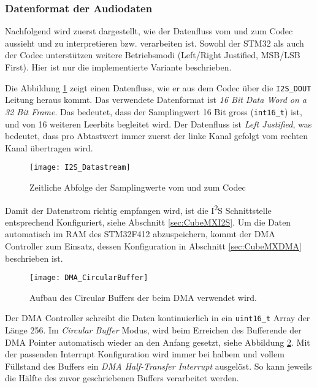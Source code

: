 \subsubsection{Datenformat der Audiodaten}
\label{sec:Dataformat}

Nachfolgend wird zuerst dargestellt, wie der Datenfluss vom und zum Codec aussieht und zu interpretieren bzw. verarbeiten ist. 
Sowohl der STM32 als auch der Codec unterstützen weitere Betriebsmodi (Left/Right Justified, MSB/LSB First). Hier ist nur die implementierte Variante beschrieben.

Die Abbildung \ref{pic:I2S_Datastream} zeigt einen Datenfluss, wie er aus dem Codec über die \texttt{I2S\_DOUT} Leitung heraus kommt. 
Das verwendete Datenformat ist \textit{16 Bit Data Word on a 32 Bit Frame}. Das bedeutet, dass der Samplingwert 16 Bit gross (\texttt{int16\_t}) ist, und von 16 weiteren Leerbits begleitet wird.
Der Datenfluss ist \textit{Left Justified}, was bedeutet, dass pro Abtastwert immer zuerst der linke Kanal gefolgt vom rechten Kanal übertragen wird.

\begin{figure}[H]
	\centering
	\texttt{[image: I2S\_Datastream]}
	\caption{Zeitliche Abfolge der Samplingwerte vom und zum Codec}
	\label{pic:I2S_Datastream}
\end{figure}

Damit der Datenstrom richtig empfangen wird, ist die I\textsuperscript{2}S Schnittstelle entsprechend Konfiguriert, siehe Abschnitt \ref{sec:CubeMXI2S}.
Um die Daten automatisch im RAM des STM32F412 abzuspeichern, kommt der DMA Controller zum Einsatz, dessen Konfiguration in Abschnitt \ref{sec:CubeMXDMA} beschrieben ist.

\begin{figure}[H]
	\centering
	\texttt{[image: DMA\_CircularBuffer]}
	\caption{Aufbau des Circular Buffers der beim DMA verwendet wird.}
	\label{pic:DMA_CircularBuffer}
\end{figure}

Der DMA Controller schreibt die Daten kontinuierlich in ein \texttt{uint16\_t} Array der Länge 256. Im \textit{Circular Buffer} Modus, wird beim Erreichen des Bufferende der DMA Pointer automatisch wieder an den Anfang gesetzt, siehe Abbildung \ref{pic:DMA_CircularBuffer}.
Mit der passenden Interrupt Konfiguration wird immer bei halbem und vollem Füllstand des Buffers ein \textit{DMA Half-Transfer Interrupt} ausgelöst.
So kann jeweils die Hälfte des zuvor geschriebenen Buffers verarbeitet werden.



